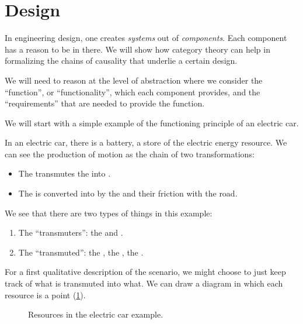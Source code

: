 

\section{Design}
\label{sec:dependencies-design}




In engineering design, one creates \emph{systems} out of \emph{components}.
Each component has a reason to be in there.
We will show how category theory can help in formalizing the chains of causality that underlie a certain design.

We will need to reason at the level of abstraction where we consider the ``function'', or ``functionality'', which each component provides, and the ``requirements'' that are needed to provide the function.

We will start with a simple example of the functioning principle of an electric car.

In an electric car, there is a battery, a store of the electric energy resource.
We can see the production of motion as the chain of two transformations:

\begin{itemize}
    \item The \motor transmutes the \electricpower into \rotationalmotion.
    \item The \rotationalmotion is converted into \translationalmotion by the \wheels and their friction with the road.
\end{itemize}

We see that there are two types of things in this example:
\begin{enumerate}
    \item The ``transmuters'': the \motor and \wheels.
    \item The ``transmuted'': the \electricpower, the \rotationalmotion, the \translationalmotion.
\end{enumerate}

For a first qualitative description of the scenario, we might choose to just keep track of what is transmuted into what.
We can draw a diagram in which each resource is a point (\cref{fig:e1}).

\begin{figure}[h!]
    \centering
    \caption{Resources in the electric car example.}
    \label{fig:e1}
\end{figure}


